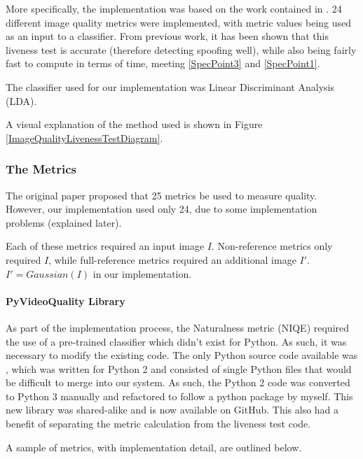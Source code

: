 \documentclass[12pt,a4paper]{article}
\begin{document}
            More specifically, the implementation was based on the work contained in \cite{ImageQualityAssessmentTest}. 24 different image quality metrics were implemented,
            with metric values being used as an input to a classifier. From previous work, it has been shown that this liveness test is accurate (therefore detecting spoofing well), while also being fairly fast to compute in terms of time, meeting \ref{SpecPoint3} and \ref{SpecPoint1}.

            The classifier used for our implementation was Linear Discriminant Analysis (LDA).

            A visual explanation of the method used is shown in Figure \ref{ImageQualityLivenessTestDiagram}.

         
    
            \subsubsection{The Metrics}
            The original paper proposed that 25 metrics be used to measure quality. However, our implementation used only 24, due to some implementation problems (explained later).

            Each of these metrics required an input image $I$. Non-reference metrics only required $I$, while full-reference metrics required an additional image $I'$. $I' = Gaussian(I)$ in our implementation.
            
            \paragraph{PyVideoQuality Library}
            As part of the implementation process, the Naturalness metric (NIQE) required the use of a pre-trained classifier which didn't exist for Python. As such, it was necessary to modify the existing code.
            The only Python source code available was \cite{VideoQualityOriginal}, which was written for Python 2 and consisted of single Python files that would be difficult to merge into our system.
            As such, the Python 2 code was converted to Python 3 manually and refactored to follow a python package by myself. This new library was shared-alike and is now available on GitHub. \cite{VideoQualityUpdated} This also had a benefit of separating the metric calculation from the liveness test code.
            
            A sample of metrics, with implementation detail, are outlined below.
           
\end{document}
